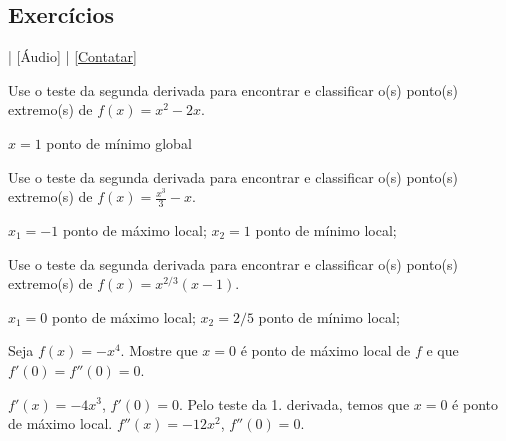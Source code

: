 \subsection*{Exercícios}

\begin{flushright}
  [Vídeo] | [Áudio] | \href{https://phkonzen.github.io/notas/contato.html}{[Contatar]}
\end{flushright}

\begin{exer}
  Use o teste da segunda derivada para encontrar e classificar o(s) ponto(s) extremo(s) de $f(x) = x^2 - 2x$.
\end{exer}
\begin{resp}
  $x=1$ ponto de mínimo global
\end{resp}

\begin{exer}
  Use o teste da segunda derivada para encontrar e classificar o(s) ponto(s) extremo(s) de $\displaystyle f(x) = \frac{x^3}{3}-x$.
\end{exer}
\begin{resp}
  $x_1=-1$ ponto de máximo local; $x_2=1$ ponto de mínimo local;
\end{resp}

\begin{exer}
  Use o teste da segunda derivada para encontrar e classificar o(s) ponto(s) extremo(s) de $\displaystyle f(x) = x^{2/3}(x-1)$.
\end{exer}
\begin{resp}
  $x_1=0$ ponto de máximo local; $x_2=2/5$ ponto de mínimo local;
\end{resp}

\begin{exer}
  Seja $f(x) = -x^4$. Mostre que $x=0$ é ponto de máximo local de $f$ e que $f'(0) = f''(0) = 0$.
\end{exer}
\begin{resp}
  $f'(x) = -4x^3$, $f'(0)=0$. Pelo teste da 1. derivada, temos que $x=0$ é ponto de máximo local. $f''(x) = -12x^2$, $f''(0)=0$.
\end{resp}
